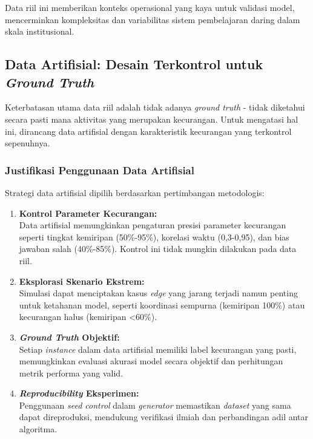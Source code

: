 Data riil ini memberikan konteks operasional yang kaya untuk validasi model, mencerminkan kompleksitas dan variabilitas sistem pembelajaran daring dalam skala institusional.

\subsection{Data Artifisial: Desain Terkontrol untuk \textit{Ground Truth}}
\label{sec:dataArtifisial}

Keterbatasan utama data riil adalah tidak adanya \textit{ground truth} - tidak diketahui secara pasti mana aktivitas yang merupakan kecurangan. Untuk mengatasi hal ini, dirancang data artifisial dengan karakteristik kecurangan yang terkontrol sepenuhnya.

\subsubsection{Justifikasi Penggunaan Data Artifisial}
\label{sec:justifikasiDataArtifisial}

Strategi data artifisial dipilih berdasarkan pertimbangan metodologis:

\begin{enumerate}
    \item \textbf{Kontrol Parameter Kecurangan:} \\
    Data artifisial memungkinkan pengaturan presisi parameter kecurangan seperti tingkat kemiripan (50\%-95\%), korelasi waktu (0,3-0,95), dan bias jawaban salah (40\%-85\%). Kontrol ini tidak mungkin dilakukan pada data riil.
    
    \item \textbf{Eksplorasi Skenario Ekstrem:} \\
    Simulasi dapat menciptakan kasus \textit{edge} yang jarang terjadi namun penting untuk ketahanan model, seperti koordinasi sempurna (kemiripan 100\%) atau kecurangan halus (kemiripan <60\%).
    
    \item \textbf{\textit{Ground Truth} Objektif:} \\
    Setiap \textit{instance} dalam data artifisial memiliki label kecurangan yang pasti, memungkinkan evaluasi akurasi model secara objektif dan perhitungan metrik performa yang valid.
    
    \item \textbf{\textit{Reproducibility} Eksperimen:} \\
    Penggunaan \textit{seed control} dalam \textit{generator} memastikan \textit{dataset} yang sama dapat direproduksi, mendukung verifikasi ilmiah dan perbandingan adil antar algoritma.
\end{enumerate}

